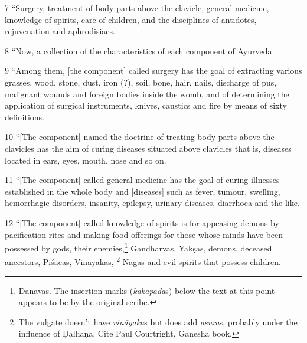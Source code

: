 \documentclass[12pt]{article}
\begin{document}
\begin{translation}
    \item[7] “Surgery, treatment of body parts above the clavicle, general medicine, 
    knowledge of spirits, care of children, and the disciplines of antidotes, rejuvenation 
    and aphrodisiacs.
  
        \item[8] “Now,  a collection of the characteristics of each component of 
        Āyurveda.
    
        \item[9] “Among them, [the component] called surgery has the goal of 
        extracting 
        various grasses, wood, stone, dust, iron (?), soil, bone, hair, nails, discharge of 
        pus, malignant wounds and foreign bodies inside the womb, and of determining 
        the application of surgical instruments, knives, caustics and fire by means of 
        sixty definitions.
        
        \item[10] “[The component] named the doctrine of treating body parts above 
        the clavicles has the aim of curing diseases situated above clavicles that is,  
        diseases located in ears, eyes, mouth, nose and so on.
        
        \item[11] “[The component] called general medicine has the goal of curing 
        illnesses established in the whole body and [diseases] such as fever, tumour, 
        swelling, hemorrhagic disorders, insanity, epilepsy, urinary diseases, diarrhoea 
        and the like.
        
        \item[12] “[The component] called knowledge of spirits is for appeasing
demons by pacification rites and making food offerings for those whose
minds have been possessed by gods, their enemies,\footnote{Dānavas.  The
insertion marks (\emph{kākapada}s) below the text at this point appears to
be by the original scribe.} Gandharvas, Yakṣas, demons, deceased
ancestors, Piśācas, Vināyakas, \footnote{The vulgate doesn't have
\emph{vināyaka}s but does add \emph{asura}s, probably under the influence
of Ḍalhaṇa.  Cite Paul Courtright, Ganesha book.} Nāgas and evil spirits
that possess children. %
          

\end{translation}
\end{document}
